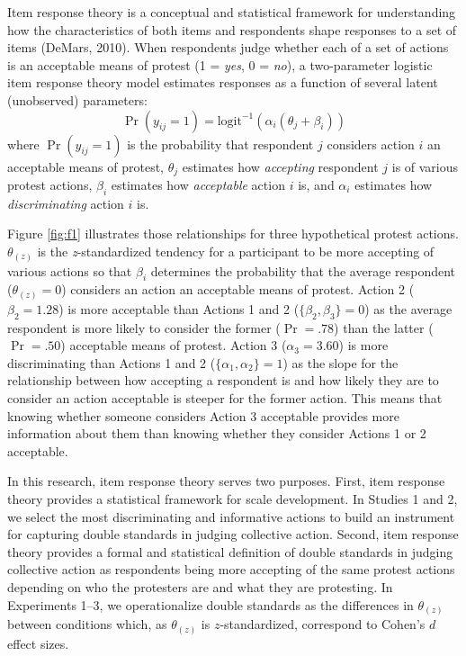\documentclass[twocolumn, 11pt, letterpaper]{article}
\begin{document}
Item response theory is a conceptual and statistical framework for
understanding how the characteristics of both items and respondents
shape responses to a set of items (DeMars, 2010). When respondents judge
whether each of a set of actions is an acceptable means of protest (1 =
\emph{yes}, 0 = \emph{no}), a two-parameter logistic item response
theory model estimates responses as a function of several latent
(unobserved) parameters:
\[ \Pr ( y_{ij} = 1 ) = \text{logit}^{-1} ( \alpha_i ( \theta_j + \beta_i ) ) \]
where \(\Pr ( y_{ij} = 1 )\) is the probability that respondent \(j\)
considers action \(i\) an acceptable means of protest, \(\theta_j\)
estimates how \emph{accepting} respondent \(j\) is of various protest
actions, \(\beta_i\) estimates how \emph{acceptable} action \(i\) is,
and \(\alpha_i\) estimates how \emph{discriminating} action \(i\) is.

Figure \ref{fig:f1} illustrates those relationships for three
hypothetical protest actions. \(\theta_{(z)}\) is the
\emph{z}-standardized tendency for a participant to be more accepting of
various actions so that \(\beta_i\) determines the probability that the
average respondent (\(\theta_{(z)} = 0\)) considers an action an
acceptable means of protest. Action 2 (\(\beta_2 = 1.28\)) is more
acceptable than Actions 1 and 2 (\(\{ \beta_2, \beta_3 \} = 0\)) as the
average respondent is more likely to consider the former (\(\Pr = .78\))
than the latter (\(\Pr = .50\)) acceptable means of protest. Action 3
(\(\alpha_3 = 3.60\)) is more discriminating than Actions 1 and 2
(\(\{ \alpha_1, \alpha_2 \} = 1\)) as the slope for the relationship
between how accepting a respondent is and how likely they are to
consider an action acceptable is steeper for the former action. This
means that knowing whether someone considers Action 3 acceptable
provides more information about them than knowing whether they consider
Actions 1 or 2 acceptable.

In this research, item response theory serves two purposes. First, item
response theory provides a statistical framework for scale development.
In Studies 1 and 2, we select the most discriminating and informative
actions to build an instrument for capturing double standards in judging
collective action. Second, item response theory provides a formal and
statistical definition of double standards in judging collective action
as respondents being more accepting of the same protest actions
depending on who the protesters are and what they are protesting. In
Experiments 1--3, we operationalize double standards as the differences
in \(\theta_{(z)}\) between conditions which, as \(\theta_{(z)}\) is
\(z\)-standardized, correspond to Cohen's \(d\) effect sizes.
\end{document}
